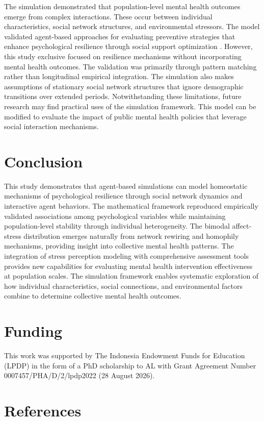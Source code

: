 \documentclass[
  letterpaper,
  DIV=11,
  numbers=noendperiod]{scrartcl}
\begin{document}
The simulation demonstrated that population-level mental health outcomes
emerge from complex interactions. These occur between individual
characteristics, social network structures, and environmental stressors.
The model validated agent-based approaches for evaluating preventive
strategies that enhance psychological resilience through social support
optimization \citep{Benny2022}. However, this study exclusive focused on
resilience mechanisms without incorporating mental health outcomes. The
validation was primarily through pattern matching rather than
longitudinal empirical integration. The simulation also makes
assumptions of stationary social network structures that ignore
demographic transitions over extended periods. Notwithstanding these
limitations, future research may find practical uses of the simulation
framework. This model can be modified to evaluate the impact of public
mental health policies that leverage social interaction mechanisms.

\section{Conclusion}\label{conclusion}

This study demonstrates that agent-based simulations can model
homeostatic mechanisms of psychological resilience through social
network dynamics and interactive agent behaviors. The mathematical
framework reproduced empirically validated associations among
psychological variables while maintaining population-level stability
through individual heterogeneity. The bimodal affect-stress distribution
emerges naturally from network rewiring and homophily mechanisms,
providing insight into collective mental health patterns. The
integration of stress perception modeling with comprehensive assessment
tools provides new capabilities for evaluating mental health
intervention effectiveness at population scales. The simulation
framework enables systematic exploration of how individual
characteristics, social connections, and environmental factors combine
to determine collective mental health outcomes.

\section{Funding}\label{funding}

This work was supported by The Indonesia Endowment Funds for Education
(LPDP) in the form of a PhD scholarship to AL with Grant Agreement
Number 0007457/PHA/D/2/lpdp2022 (28 August 2026).

\section*{References}\label{references}

\footnotesize



\end{document}
